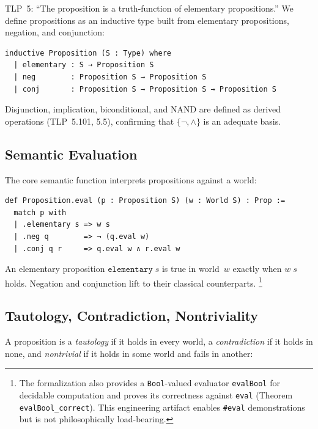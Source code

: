 \documentclass[10pt, letterpaper]{article}
\theoremstyle{definition}
\theoremstyle{remark}
\begin{document}
TLP~5: ``The proposition is a truth-function of elementary
propositions.''  We define propositions as an inductive type
built from elementary propositions, negation, and conjunction:

\begin{lstlisting}
inductive Proposition (S : Type) where
  | elementary : S → Proposition S
  | neg        : Proposition S → Proposition S
  | conj       : Proposition S → Proposition S → Proposition S
\end{lstlisting}

\noindent
Disjunction, implication, biconditional, and NAND are defined as
derived operations (TLP~5.101, 5.5), confirming that $\{\lnot, \land\}$
is an adequate basis.

\subsection{Semantic Evaluation}
\label{sec:eval}

The core semantic function interprets propositions against a
world:

\begin{lstlisting}
def Proposition.eval (p : Proposition S) (w : World S) : Prop :=
  match p with
  | .elementary s => w s
  | .neg q        => ¬ (q.eval w)
  | .conj q r     => q.eval w ∧ r.eval w
\end{lstlisting}

\noindent
An elementary proposition $\mathtt{elementary}\;s$ is true in
world~$w$ exactly when $w\;s$ holds.  Negation and conjunction
lift to their classical counterparts.%
\footnote{The formalization also provides a
\texttt{Bool}-valued evaluator \texttt{evalBool} for decidable
computation and proves its correctness against
\texttt{eval} (Theorem \texttt{evalBool\_correct}).
This engineering artifact enables \texttt{\#eval} demonstrations
but is not philosophically load-bearing.}

\subsection{Tautology, Contradiction, Nontriviality}
\label{sec:tautology}

A proposition is a \emph{tautology} if it holds in every world,
a \emph{contradiction} if it holds in none, and
\emph{nontrivial} if it holds in some world and fails in
another:
\end{document}
